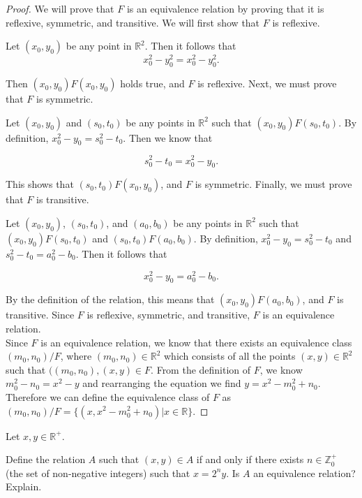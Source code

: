 \documentclass[12pt]{article}
\newenvironment{problem}[2][Problem]{\begin{trivlist}
\item[\hskip \labelsep {\bfseries #1}\hskip \labelsep {\bfseries #2.}]}{\end{trivlist}}
\begin{document}
\begin{proof}
    We will prove that $F$ is an equivalence relation by proving that it is reflexive, symmetric, and transitive. We will first show that $F$ is reflexive.

    \noindent
    Let $(x_0, y_0)$ be any point in $\mathbb{R}^2$. Then it follows that
    $$x_0^2 - y_0^2 = x_0^2 - y_0^2.$$
    
    \noindent
    Then $(x_0, y_0)F(x_0, y_0)$ holds true, and $F$ is reflexive. Next, we must prove that $F$ is symmetric.

    \noindent
    Let $(x_0, y_0)$ and $(s_0, t_0)$ be any points in $\mathbb{R}^2$ such that $(x_0, y_0)F(s_0, t_0)$. By definition, $x_0^2 - y_0 = s_0^2 - t_0$. Then we know that 
    
    $$s_0^2 - t_0 = x_0^2 - y_0.$$

    \noindent
    This shows that $(s_0, t_0)F(x_0, y_0)$, and $F$ is symmetric. Finally, we must prove that $F$ is transitive.

    Let $(x_0, y_0)$, $(s_0, t_0)$, and $(a_0, b_0)$ be any points in $\mathbb{R}^2$ such that $(x_0, y_0)F(s_0, t_0)$ and $(s_0, t_0)F(a_0, b_0)$. By definition, $x_0^2 - y_0 = s_0^2 - t_0$ and $s_0^2 - t_0 = a_0^2 - b_0$. Then it follows that
    
    $$x_0^2 - y_0 = a_0^2 - b_0.$$

    \noindent By the definition of the relation, this means that $(x_0, y_0)F(a_0, b_0)$, and $F$ is transitive. Since $F$ is reflexive, symmetric, and transitive, $F$ is an equivalence relation.\\


\noindent Since $F$ is an equivalence relation, we know that there exists an equivalence class $(m_0,n_0)/F$, where $(m_0,n_0)\in \mathbb{R}^2$ which consists of all the points $(x,y) \in \mathbb{R}^2$ such that $((m_0,n_0),(x,y) \in F$. From the definition of $F$, we know $m_0^2 - n_0 = x^2 - y$ and rearranging the equation we find $y = x^2 - m_0^2 + n_0$. Therefore we can define the equivalence class of $F$ as $(m_0,n_0)/F = \{(x, x^2 - m_0^2 + n_0)| x \in \mathbb{R}\}$.

%

\end{proof}


\begin{problem}{8a}
    Let \( x, y \in \mathbb{R}^+ \).

\noindent Define the relation \( A \) such that \( (x, y) \in A \) if and only if there exists \( n \in \mathbb{Z}^+_0 \) (the set of non-negative integers) such that \( x = 2^n y \). Is \( A \) an equivalence relation? Explain.
\end{problem}
\end{document}
